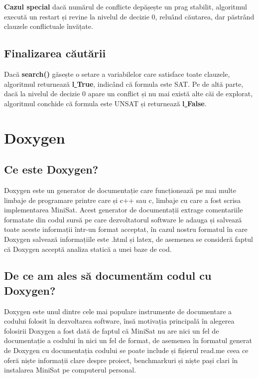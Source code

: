 \documentclass[runningheads]{llncs}
\begin{document}
\textbf{Cazul special} dacă numărul de conflicte depășește un prag stabilit, algoritmul execută un restart și revine la nivelul de decizie 0, reluând căutarea, dar păstrând clauzele conflictuale învățate.

\subsection{Finalizarea căutării} Dacă \textbf{search()} găsește o setare a variabilelor care satisface toate clauzele, algoritmul returnează \textbf{l\underline{ }True}, indicând că formula este SAT. Pe de altă parte, dacă la nivelul de decizie 0 apare un conflict și nu mai există alte căi de explorat, algoritmul conchide că formula este UNSAT și returnează \textbf{l\underline{ }False}.

\section{Doxygen}
\subsection{Ce este Doxygen?}
Doxygen \cite{doxygenmanual} este un generator de documentație care funcționează pe mai multe limbaje de programare printre care și c++ sau c, limbaje cu care a fost scrisa implementarea MiniSat. Acest generator de documentații extrage comentariile formatate din codul sursă pe care dezvoltatorul software le adauga și salvează toate aceste informații într-un format acceptat, în cazul nostru formatul în care Doxygen salvează informațiile este .html și latex, de asemenea se consideră faptul că Doxygen acceptă analiza statică a unei baze de cod.
\subsection{De ce am ales să documentăm codul cu Doxygen?}
Doxygen este unul dintre cele mai populare instrumente de documentare a codului folosit în dezvoltarea software, însă motivația principală în alegerea folosirii Doxygen a fost dată de faptul că MiniSat nu are nici un fel de documentație a codului în nici un fel de format, de asemenea în formatul generat de Doxygen cu documentația codului se poate include și fișierul read.me ceea ce oferă niște informații clare despre proiect, benchmarkuri și niște pași clari în instalarea MiniSat pe computerul personal.
\end{document}
